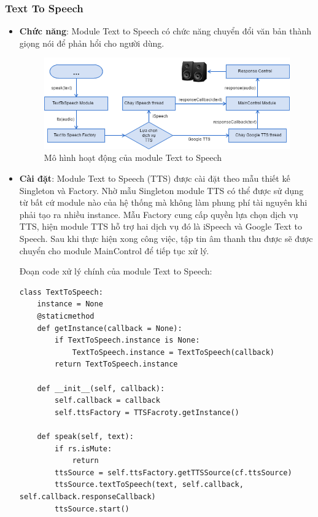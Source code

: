 \subsubsection{Text To Speech}
\begin{itemize}
\item \textbf{Chức năng}: Module Text to Speech có chức năng chuyển đổi văn bản thành giọng nói để phản hổi cho người dùng.

\begin{figure}[h]
    \centering
    \includegraphics[scale=0.5]{tts_flowchart}
    \caption{Mô hình hoạt động của module Text to Speech}
    \label{fig:c6_tts_flowchart}
\end{figure}

\item \textbf{Cài đặt}: Module Text to Speech (TTS) được cài đặt theo mẫu thiết kế Singleton và Factory. Nhờ mẫu Singleton module TTS có thể được sử dụng từ bất cứ module nào của hệ thống mà không làm phung phí tài nguyên khi phải tạo ra nhiều instance. Mẫu Factory cung cấp quyền lựa chọn dịch vụ TTS, hiện module TTS hỗ trợ hai dịch vụ đó là iSpeech và Google Text to Speech. Sau khi thực hiện xong công việc, tập tin âm thanh thu được sẽ được chuyển cho module MainControl để tiếp tục xử lý.

Đoạn code xử lý chính của module Text to Speech:
\begin{lstlisting}
class TextToSpeech:
    instance = None
    @staticmethod
    def getInstance(callback = None):
        if TextToSpeech.instance is None:
            TextToSpeech.instance = TextToSpeech(callback)
        return TextToSpeech.instance
    
    def __init__(self, callback):
        self.callback = callback
        self.ttsFactory = TTSFacroty.getInstance()

    def speak(self, text):
        if rs.isMute:
            return
        ttsSource = self.ttsFactory.getTTSSource(cf.ttsSource)
        ttsSource.textToSpeech(text, self.callback, self.callback.responseCallback)
        ttsSource.start()


\end{lstlisting}
\end{itemize}
